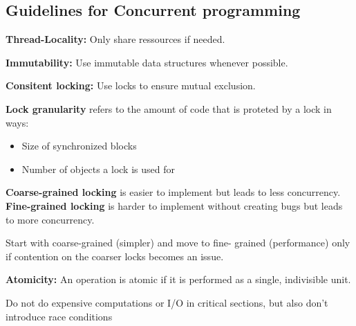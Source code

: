 \subsection{Guidelines for Concurrent programming}

\begin{important}
\textbf{Thread-Locality:} Only share ressources if needed.
\end{important}

\begin{important}
\textbf{Immutability:} Use immutable data structures whenever possible.
\end{important}

\begin{important}
\textbf{Consitent locking:} Use locks to ensure mutual exclusion.
\end{important}

\begin{definition}
\textbf{Lock granularity } refers to the amount of code that is proteted by a lock in ways:
\begin{itemize}
        \item Size of synchronized blocks
        \item Number of objects a lock is used for
\end{itemize}
\end{definition}

\begin{theorem}
\textbf{Coarse-grained locking} is easier to implement but leads to less concurrency. \textbf{Fine-grained locking} is harder to implement without creating bugs but leads to more concurrency.
\end{theorem}

\begin{important}
Start with coarse-grained (simpler) and move to fine-
grained (performance) only if contention on the coarser locks becomes an issue.
\end{important}

\begin{definition}
\textbf{Atomicity: } An operation is atomic if it is performed as a single, indivisible unit. 
\end{definition}

\begin{important}
    Do not do expensive computations or I/O in critical
    sections, but also don't introduce race conditions
\end{important}
